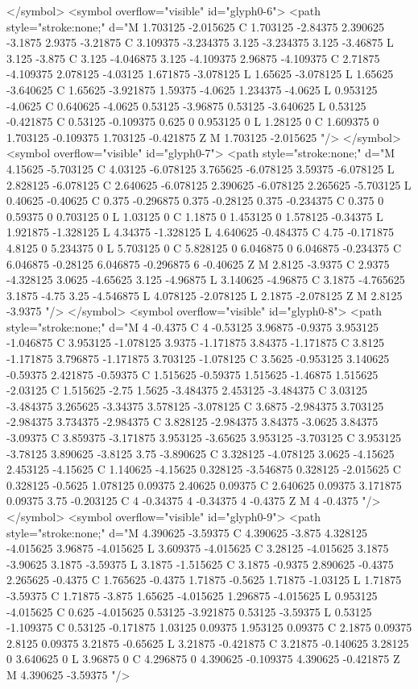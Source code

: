 </symbol>
<symbol overflow="visible" id="glyph0-6">
<path style="stroke:none;" d="M 1.703125 -2.015625 C 1.703125 -2.84375 2.390625 -3.1875 2.9375 -3.21875 C 3.109375 -3.234375 3.125 -3.234375 3.125 -3.46875 L 3.125 -3.875 C 3.125 -4.046875 3.125 -4.109375 2.96875 -4.109375 C 2.71875 -4.109375 2.078125 -4.03125 1.671875 -3.078125 L 1.65625 -3.078125 L 1.65625 -3.640625 C 1.65625 -3.921875 1.59375 -4.0625 1.234375 -4.0625 L 0.953125 -4.0625 C 0.640625 -4.0625 0.53125 -3.96875 0.53125 -3.640625 L 0.53125 -0.421875 C 0.53125 -0.109375 0.625 0 0.953125 0 L 1.28125 0 C 1.609375 0 1.703125 -0.109375 1.703125 -0.421875 Z M 1.703125 -2.015625 "/>
</symbol>
<symbol overflow="visible" id="glyph0-7">
<path style="stroke:none;" d="M 4.15625 -5.703125 C 4.03125 -6.078125 3.765625 -6.078125 3.59375 -6.078125 L 2.828125 -6.078125 C 2.640625 -6.078125 2.390625 -6.078125 2.265625 -5.703125 L 0.40625 -0.40625 C 0.375 -0.296875 0.375 -0.28125 0.375 -0.234375 C 0.375 0 0.59375 0 0.703125 0 L 1.03125 0 C 1.1875 0 1.453125 0 1.578125 -0.34375 L 1.921875 -1.328125 L 4.34375 -1.328125 L 4.640625 -0.484375 C 4.75 -0.171875 4.8125 0 5.234375 0 L 5.703125 0 C 5.828125 0 6.046875 0 6.046875 -0.234375 C 6.046875 -0.28125 6.046875 -0.296875 6 -0.40625 Z M 2.8125 -3.9375 C 2.9375 -4.328125 3.0625 -4.65625 3.125 -4.96875 L 3.140625 -4.96875 C 3.1875 -4.765625 3.1875 -4.75 3.25 -4.546875 L 4.078125 -2.078125 L 2.1875 -2.078125 Z M 2.8125 -3.9375 "/>
</symbol>
<symbol overflow="visible" id="glyph0-8">
<path style="stroke:none;" d="M 4 -0.4375 C 4 -0.53125 3.96875 -0.9375 3.953125 -1.046875 C 3.953125 -1.078125 3.9375 -1.171875 3.84375 -1.171875 C 3.8125 -1.171875 3.796875 -1.171875 3.703125 -1.078125 C 3.5625 -0.953125 3.140625 -0.59375 2.421875 -0.59375 C 1.515625 -0.59375 1.515625 -1.46875 1.515625 -2.03125 C 1.515625 -2.75 1.5625 -3.484375 2.453125 -3.484375 C 3.03125 -3.484375 3.265625 -3.34375 3.578125 -3.078125 C 3.6875 -2.984375 3.703125 -2.984375 3.734375 -2.984375 C 3.828125 -2.984375 3.84375 -3.0625 3.84375 -3.09375 C 3.859375 -3.171875 3.953125 -3.65625 3.953125 -3.703125 C 3.953125 -3.78125 3.890625 -3.8125 3.75 -3.890625 C 3.328125 -4.078125 3.0625 -4.15625 2.453125 -4.15625 C 1.140625 -4.15625 0.328125 -3.546875 0.328125 -2.015625 C 0.328125 -0.5625 1.078125 0.09375 2.40625 0.09375 C 2.640625 0.09375 3.171875 0.09375 3.75 -0.203125 C 4 -0.34375 4 -0.34375 4 -0.4375 Z M 4 -0.4375 "/>
</symbol>
<symbol overflow="visible" id="glyph0-9">
<path style="stroke:none;" d="M 4.390625 -3.59375 C 4.390625 -3.875 4.328125 -4.015625 3.96875 -4.015625 L 3.609375 -4.015625 C 3.28125 -4.015625 3.1875 -3.90625 3.1875 -3.59375 L 3.1875 -1.515625 C 3.1875 -0.9375 2.890625 -0.4375 2.265625 -0.4375 C 1.765625 -0.4375 1.71875 -0.5625 1.71875 -1.03125 L 1.71875 -3.59375 C 1.71875 -3.875 1.65625 -4.015625 1.296875 -4.015625 L 0.953125 -4.015625 C 0.625 -4.015625 0.53125 -3.921875 0.53125 -3.59375 L 0.53125 -1.109375 C 0.53125 -0.171875 1.03125 0.09375 1.953125 0.09375 C 2.1875 0.09375 2.8125 0.09375 3.21875 -0.65625 L 3.21875 -0.421875 C 3.21875 -0.140625 3.28125 0 3.640625 0 L 3.96875 0 C 4.296875 0 4.390625 -0.109375 4.390625 -0.421875 Z M 4.390625 -3.59375 "/>
